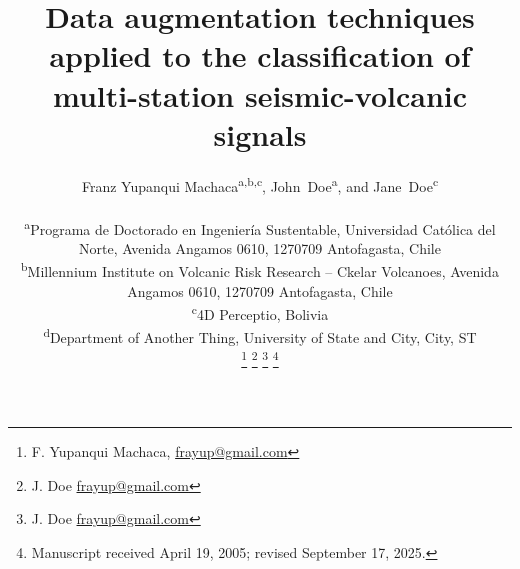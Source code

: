 \documentclass[journal]{IEEEtran}
\begin{document}
%
\title{Data augmentation techniques applied to the classification of multi-station seismic-volcanic signals}
%
%
%

\author{Franz Yupanqui Machaca\textsuperscript{a,b,c}, John~Doe\textsuperscript{a}, and
  Jane~Doe\textsuperscript{c}\\
  \vspace{1mm}
  \begin{flushleft}
  \small\textsuperscript{a}Programa de Doctorado en Ingeniería Sustentable, Universidad Católica del Norte, Avenida Angamos 0610, 1270709 Antofagasta, Chile\\
  \textsuperscript{b}Millennium Institute on Volcanic Risk Research – Ckelar Volcanoes, Avenida Angamos 0610, 1270709 Antofagasta, Chile\\
  \textsuperscript{c}4D Perceptio, Bolivia\\
  \textsuperscript{d}Department of Another Thing, University of State and City, City, ST
  \end{flushleft}
  \thanks{F. Yupanqui Machaca, \color{blue}\href{mailto:frayup@gmail.com}{frayup@gmail.com} }
  \thanks{J. Doe \color{blue}\href{mailto:frayup@gmail.com}{frayup@gmail.com} }
  \thanks{J. Doe \color{blue}\href{mailto:frayup@gmail.com}{frayup@gmail.com} }
  \thanks{Manuscript received April 19, 2005; revised September 17, 2025.}
}


% 
%
\end{document}
